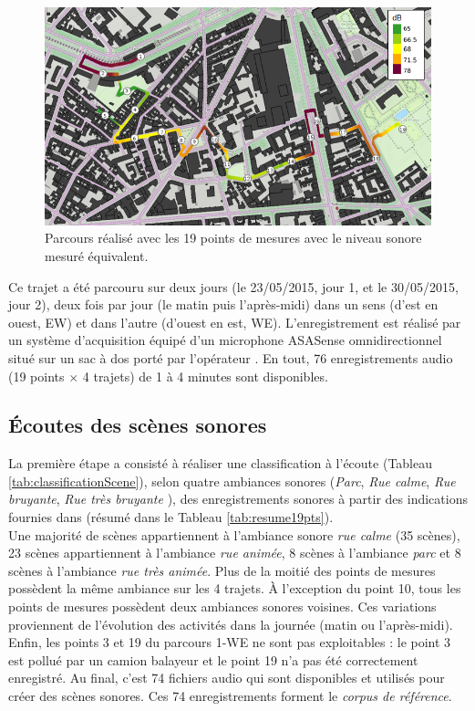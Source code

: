 \begin{figure}[hbtp]
\centering
\includegraphics[width=.7\textwidth]{./figures/grafic/trajet_19pts.png}
\caption{Parcours réalisé avec les 19 points de mesures avec le niveau sonore mesuré équivalent.}
\label{fig:parcoursGRAFIC}
\end{figure}

Ce trajet a été parcouru sur deux jours (le 23/05/2015, jour 1, et le 30/05/2015, jour 2), deux fois par jour (le matin puis l'après-midi) dans un sens (d'est en ouest, EW) et dans l'autre (d'ouest en est, WE). L'enregistrement est réalisé par un système d'acquisition équipé d'un microphone ASASense omnidirectionnel situé sur un sac à dos porté par l'opérateur \cite{aumond2017modeling}. En tout, 76 enregistrements audio (19 points $\times$ 4 trajets) de 1 à 4 minutes sont disponibles. \\




\subsection{Écoutes des scènes sonores}

La première étape a consisté à réaliser une classification à l'écoute (Tableau \ref{tab:classificationScene}), selon quatre ambiances sonores (\textit{Parc}, \textit{Rue calme}, \textit{Rue bruyante}, \textit{Rue très bruyante} \cite{can_describing_2015}), des enregistrements sonores à partir des indications fournies dans \cite{aumond2017modeling} (résumé dans le Tableau \ref{tab:resume19pts}).\\



Une majorité de scènes appartiennent à l'ambiance sonore \textit{rue calme} (35 scènes), 23 scènes appartiennent à l'ambiance \textit{rue animée}, 8 scènes à l'ambiance \textit{parc} et 8 scènes à l'ambiance \textit{rue très animée}. Plus de la moitié des points de mesures possèdent la même ambiance sur les 4 trajets. À l'exception du point 10, tous les points de mesures possèdent deux ambiances sonores voisines. Ces variations proviennent de l'évolution des activités dans la journée (matin ou l'après-midi). Enfin, les points 3 et 19 du parcours 1-WE ne sont pas exploitables : le point 3 est pollué par un camion balayeur et le point 19 n'a pas été correctement enregistré. Au final, c'est 74 fichiers audio qui sont disponibles et utilisés pour créer des scènes sonores. Ces 74 enregistrements forment le \textit{corpus de référence}.

